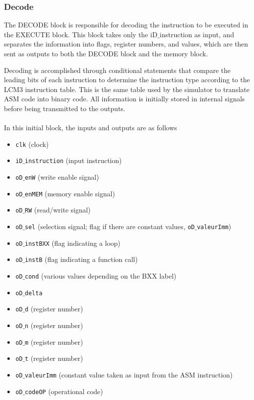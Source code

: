 \documentclass{article}
\begin{document}
\subsubsection{Decode}

The DECODE block is responsible for decoding the instruction to be executed in the EXECUTE block. This block takes only the iD$\_$instruction as input, and separates the information into flags, register numbers, and values, which are then sent as outputs to both the DECODE block and the memory block.

Decoding is accomplished through conditional statements that compare the leading bits of each instruction to determine the instruction type according to the LCM3 instruction table. This is the same table used by the simulator to translate ASM code into binary code. All information is initially stored in internal signals before being transmitted to the outputs.


\paragraph{}In this initial block, the inputs and outputs are as follows
\begin{itemize}

\item \texttt{clk} (clock)
\item \texttt{iD$\_$instruction} (input instruction)
\item \texttt{oD$\_$enW} (write enable signal)
\item \texttt{oD$\_$enMEM} (memory enable signal)
\item \texttt{oD$\_$RW} (read/write signal)
\item \texttt{oD$\_$sel} (selection signal; flag if there are constant values, \texttt{oD$\_$valeurImm})
\item \texttt{oD$\_$instBXX} (flag indicating a loop)
\item \texttt{oD$\_$instB} (flag indicating a function call)
\item \texttt{oD$\_$cond} (various values depending on the BXX label)
\item \texttt{oD$\_$delta}
\item \texttt{oD$\_$d} (register number)
\item \texttt{oD$\_$n} (register number)
\item \texttt{oD$\_$m} (register number)
\item \texttt{oD$\_$t} (register number)
\item \texttt{oD$\_$valeurImm} (constant value taken as input from the ASM instruction)
\item \texttt{oD$\_$codeOP} (operational code)
\end{itemize}
\end{document}
